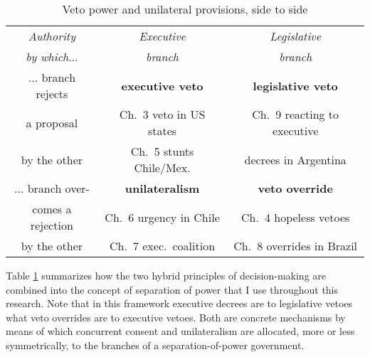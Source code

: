 \begin{table}
\begin{center}
\begin{tabular}{c|c|c}
\emph{Authority}        & \emph{Executive}             &  \emph{Legislative}              \\
\emph{by which$\ldots$} & \emph{branch}                &  \emph{branch}                   \\ \hline
$\ldots$ branch rejects & \textbf{executive veto}      & \textbf{legislative veto}        \\
a proposal              & Ch.\ 3 veto in US states     &  Ch.\ 9 reacting to executive    \\
by the other            & Ch.\ 5 stunts Chile/Mex.     &  decrees in Argentina            \\ \hline
$\ldots$ branch over-   & \textbf{unilateralism}       & \textbf{veto override}           \\
comes a rejection       & Ch.\ 6 urgency in Chile      &  Ch.\ 4 hopeless vetoes          \\
by the other            & Ch.\ 7 exec.\ coalition      &  Ch.\ 8 overrides in Brazil      \\
\end{tabular}
\caption{Veto power and unilateral provisions, side to side}\label{t:twoPrinciples}
\end{center}
\end{table}

Table \ref{t:twoPrinciples} summarizes how the two hybrid principles of decision-making are combined into the concept of separation of power that I use throughout this research.  Note that in this framework executive decrees are to legislative vetoes what veto overrides are to executive vetoes.  Both are concrete mechanisms by means of which concurrent consent and unilateralism are allocated, more or less symmetrically, to the branches of a separation-of-power government. 

